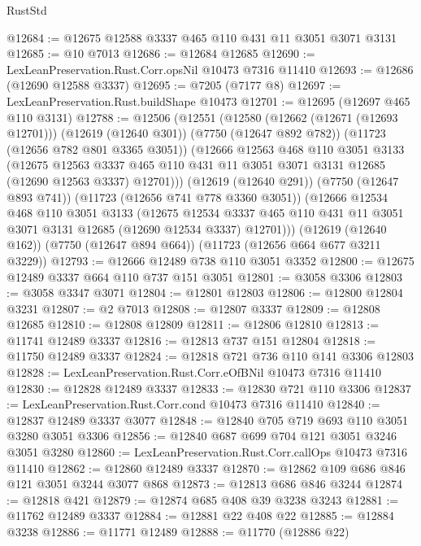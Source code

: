 \begin{lexlean}{RustStd}
\begin{coremodule}
@12684 := @12675 @12588 @3337 @465 @110 @431 @11 @3051 @3071 @3131
@12685 := @10 @7013
@12686 := @12684 @12685
@12690 := LexLeanPreservation.Rust.Corr.opsNil @10473 @7316 @11410
@12693 := @12686 (@12690 @12588 @3337)
@12695 := @7205 (@7177 @8)
@12697 := LexLeanPreservation.Rust.buildShape @10473
@12701 := @12695 (@12697 @465 @110 @3131)
@12788 := @12506
    (@12551
      (@12580
        (@12662 (@12671 (@12693 @12701)))
        (@12619 (@12640 @301))
        (@7750 (@12647 @892 @782))
        (@11723 (@12656 @782 @801 @3365 @3051))
        (@12666
          @12563
          @468
          @110
          @3051
          @3133
          (@12675
            @12563
            @3337
            @465
            @110
            @431
            @11
            @3051
            @3071
            @3131
            @12685
            (@12690 @12563 @3337)
            @12701)))
      (@12619 (@12640 @291))
      (@7750 (@12647 @893 @741))
      (@11723 (@12656 @741 @778 @3360 @3051))
      (@12666
        @12534
        @468
        @110
        @3051
        @3133
        (@12675
          @12534
          @3337
          @465
          @110
          @431
          @11
          @3051
          @3071
          @3131
          @12685
          (@12690 @12534 @3337)
          @12701)))
    (@12619 (@12640 @162))
    (@7750 (@12647 @894 @664))
    (@11723 (@12656 @664 @677 @3211 @3229))
@12793 := @12666 @12489 @738 @110 @3051 @3352
@12800 := @12675 @12489 @3337 @664 @110 @737 @151 @3051
@12801 := @3058 @3306
@12803 := @3058 @3347 @3071
@12804 := @12801 @12803
@12806 := @12800 @12804 @3231
@12807 := @2 @7013
@12808 := @12807 @3337
@12809 := @12808 @12685
@12810 := @12808 @12809
@12811 := @12806 @12810
@12813 := @11741 @12489 @3337
@12816 := @12813 @737 @151 @12804
@12818 := @11750 @12489 @3337
@12824 := @12818 @721 @736 @110 @141 @3306 @12803
@12828 := LexLeanPreservation.Rust.Corr.eOfBNil @10473 @7316 @11410
@12830 := @12828 @12489 @3337
@12833 := @12830 @721 @110 @3306
@12837 := LexLeanPreservation.Rust.Corr.cond @10473 @7316 @11410
@12840 := @12837 @12489 @3337 @3077
@12848 := @12840 @705 @719 @693 @110 @3051 @3280 @3051 @3306
@12856 := @12840 @687 @699 @704 @121 @3051 @3246 @3051 @3280
@12860 := LexLeanPreservation.Rust.Corr.callOps @10473 @7316 @11410
@12862 := @12860 @12489 @3337
@12870 := @12862 @109 @686 @846 @121 @3051 @3244 @3077 @868
@12873 := @12813 @686 @846 @3244
@12874 := @12818 @421
@12879 := @12874 @685 @408 @39 @3238 @3243
@12881 := @11762 @12489 @3337
@12884 := @12881 @22 @408 @22
@12885 := @12884 @3238
@12886 := @11771 @12489
@12888 := @11770 (@12886 @22)

\end{coremodule}
\end{lexlean}
